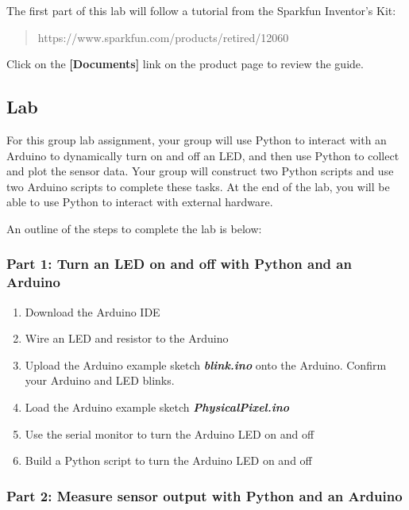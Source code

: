 \documentclass[11pt]{article}
\begin{document}
The first part of this lab will follow a tutorial from the Sparkfun
Inventor's Kit:

\begin{quote}
https://www.sparkfun.com/products/retired/12060
\end{quote}

Click on the \textbf{{[}Documents{]}} link on the product page to review
the guide.

    \hypertarget{lab}{%
\subsection{Lab}\label{lab}}

For this group lab assignment, your group will use Python to interact
with an Arduino to dynamically turn on and off an LED, and then use
Python to collect and plot the sensor data. Your group will construct
two Python scripts and use two Arduino scripts to complete these tasks.
At the end of the lab, you will be able to use Python to interact with
external hardware.

    An outline of the steps to complete the lab is below:

\hypertarget{part-1-turn-an-led-on-and-off-with-python-and-an-arduino}{%
\subsubsection{Part 1: Turn an LED on and off with Python and an
Arduino}\label{part-1-turn-an-led-on-and-off-with-python-and-an-arduino}}

\begin{enumerate}
\def\labelenumi{(\alph{enumi})}
\item
  Download the Arduino IDE
\item
  Wire an LED and resistor to the Arduino
\item
  Upload the Arduino example sketch \textbf{\emph{blink.ino}} onto the
  Arduino. Confirm your Arduino and LED blinks.
\item
  Load the Arduino example sketch \textbf{\emph{PhysicalPixel.ino}}
\item
  Use the serial monitor to turn the Arduino LED on and off
\item
  Build a Python script to turn the Arduino LED on and off
\end{enumerate}

    \hypertarget{part-2-measure-sensor-output-with-python-and-an-arduino}{%
\subsubsection{Part 2: Measure sensor output with Python and an
Arduino}\label{part-2-measure-sensor-output-with-python-and-an-arduino}}
\end{document}
